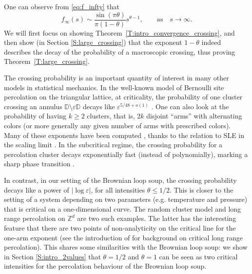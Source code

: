 \documentclass[11pt]{article}
\theoremstyle{remark}
\newcommand{\Z}{\mathbb{Z}}
\newcommand{\D}{\mathbb{D}}
\newcommand{\eps}{\varepsilon}
\numberwithin{equation}{section}
\begin{document}
One can observe from \eqref{eq:f_infty} that 
\begin{equation}
\label{E:f_infty_asymp}
f_\infty(s) \sim \frac{\sin(\pi \theta)}{\pi(1-\theta)} s^{\theta-1}, \quad \quad \text{as} \quad s \to \infty.
\end{equation}
We will first focus on showing Theorem~\ref{T:intro_convergence_crossing}, and then show (in Section \ref{S:large_crossing}) that the exponent $1-\theta$ indeed describes the decay of the probability of a macroscopic crossing, thus proving Theorem~\ref{T:large_crossing}.

\medskip

The crossing probability is an important quantity of interest in many other models in statistical mechanics. In the well-known model of Bernoulli site percolation on the triangular lattice, at criticality, the probability of one cluster crossing an annulus $\D\setminus \eps\D$ decays like $\eps^{5/48+o(1)}$ \cite{MR1887622}.  One can also look at the probability of having $k\ge 2$ clusters, that is, $2k$ disjoint ``arms'' with alternating colors (or more generally any given number of arms with prescribed colors). Many of these exponents have been computed \cite{MR1879816}, thanks to the relation to SLE in the scaling limit \cite{MR1851632}. 
In the subcritical regime, the crossing probability for a percolation cluster decays exponentially fast (instead of polynomially), marking a sharp phase transition \cite{men86, MR874906}.

In contrast, in our setting of the Brownian loop soup, the crossing probability decays like a power of $|\log\eps|$, for all intensities $\theta\le1/2$. This is closer to the setting of a system depending on two parameters (e.g. temperature and pressure) that is critical on a one-dimensional curve. The random cluster model and long range percolation on $\Z^d$ are two such examples. The latter has the interesting feature that there are two points of non-analyticity on the critical line for the one-arm exponent (see the introduction of \cite{hutchcroft2022sharp} for background on critical long range percolation). This shares some similarities with the Brownian loop soup: we show in Section \ref{S:intro_2values} that $\theta = 1/2$ and $\theta=1$ can be seen as two critical intensities for the percolation behaviour of the Brownian loop soup.

\end{document}
